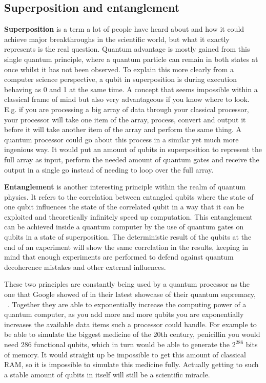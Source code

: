 \subsection{Superposition and entanglement}

\textbf{Superposition} is a term a lot of people have heard about and how it could achieve major breakthroughs in the scientific world, but what it exactly represents is the real question. Quantum advantage is mostly gained from this single quantum principle, where a quantum particle can remain in both states at once whilst it has not been observed. To explain this more clearly from a computer science perspective, a qubit in superposition is during execution behaving as 0 and 1 at the same time. A concept that seems impossible within a classical frame of mind but also very advantageous if you know where to look. E.g. if you are processing a big array of data through your classical processor, your processor will take one item of the array, process, convert and output it before it will take another item of the array and perform the same thing. A quantum processor could go about this process in a similar yet much more ingenious way. It would put an amount of qubits in superposition to represent the full array as input, perform the needed amount of quantum gates and receive the output in a single go instead of needing to loop over the full array. ~\autocite{Draper2000}

\textbf{Entanglement} is another interesting principle within the realm of quantum physics. It refers to the correlation between entangled qubits where the state of one qubit influences the state of the correlated qubit in a way that it can be exploited and theoretically infinitely speed up computation. This entanglement can be achieved inside a quantum computer by the use of quantum gates on qubits in a state of superposition. The deterministic result of the qubits at the end of an experiment will show the same correlation in the results, keeping in mind that enough experiments are performed to defend against quantum decoherence mistakes and other external influences.
~\autocite{fern2016mathematics}

These two principles are constantly being used  by a quantum processor as the one that Google showed of in their latest showcase of their quantum supremacy, ~\textcite{Google2019}. Together they are able to exponentially increase the computing power of a quantum computer, as you add more and more qubits you are exponentially increases the available data items such a processor could handle. For example to be able to simulate the biggest medicine of the 20th century, penicillin you would need 286 functional qubits, which in turn would be able to generate the $2^{286}$ bits of memory. It would straight up be impossible to get this amount of classical RAM, so it is impossible to simulate this medicine fully. Actually getting to such a stable amount of qubits in itself will still be a scientific miracle. 

